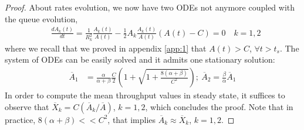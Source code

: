 \documentclass[a4paper,oneside, 11pt]{article}
\begin{document}
\begin{proof}
About rates evolution, we now have two ODEs not anymore coupled with the queue evolution,\begin{align}\label{eq:fixedpoint_A_LQF}
&\frac{dA_k(t)}{dt}=\frac{1}{R_k^2}\frac{A_k(t)}{A(t)}-\frac{1}{2}A_k\frac{A_k(t)}{A(t)}(A(t)-C)=0 \quad k=1,2
\end{align}
where we recall that we proved in appendix \ref{app:1} that $A(t)>C$, $\forall t>t_s$.
The system of ODEs can be easily solved and it admits one stationary solution:
\begin{align}\label{mean_rates_LQF}
\overline{A}_1&=\frac{\alpha}{\alpha+\beta}\frac{C}{2}\left(1+\sqrt{1+\frac{8(\alpha+\beta)}{C^2}}\right);
~\overline{A}_2=\frac{\beta}{\alpha}\overline{A}_1\end{align}
In order to compute the mean throughput values in steady state, it suffices to observe
that $\overline{X}_k=C(\overline{A}_k/\overline{A})$, $k=1,2$,
which concludes the proof. Note that in practice, $8(\alpha+\beta)<<C^2$, that implies $\overline{A}_k\approx\overline{X}_k$, $k=1,2$.
\end{proof}
\end{document}
